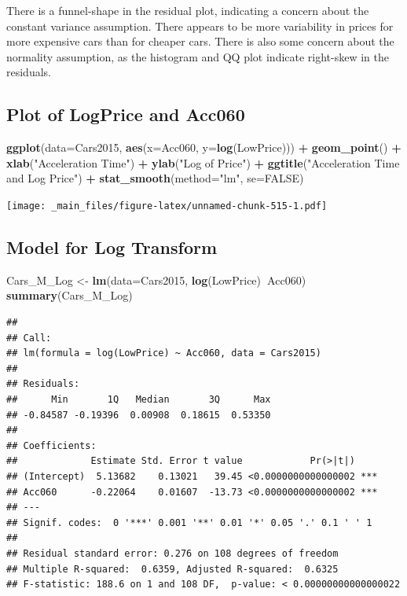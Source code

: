\documentclass[]{book}
\newenvironment{Shaded}{\begin{snugshade}}{\end{snugshade}}
\newcommand{\KeywordTok}[1]{\textcolor[rgb]{0.13,0.29,0.53}{\textbf{#1}}}
\newcommand{\DataTypeTok}[1]{\textcolor[rgb]{0.13,0.29,0.53}{#1}}
\newcommand{\StringTok}[1]{\textcolor[rgb]{0.31,0.60,0.02}{#1}}
\newcommand{\OtherTok}[1]{\textcolor[rgb]{0.56,0.35,0.01}{#1}}
\newcommand{\OperatorTok}[1]{\textcolor[rgb]{0.81,0.36,0.00}{\textbf{#1}}}
\newcommand{\NormalTok}[1]{#1}
\begin{document}
There is a funnel-shape in the residual plot, indicating a concern about
the constant variance assumption. There appears to be more variability
in prices for more expensive cars than for cheaper cars. There is also
some concern about the normality assumption, as the histogram and QQ
plot indicate right-skew in the residuals.

\subsection{Plot of LogPrice and
Acc060}\label{plot-of-logprice-and-acc060}

\begin{Shaded}
\begin{Highlighting}[]
\KeywordTok{ggplot}\NormalTok{(}\DataTypeTok{data=}\NormalTok{Cars2015, }\KeywordTok{aes}\NormalTok{(}\DataTypeTok{x=}\NormalTok{Acc060, }\DataTypeTok{y=}\KeywordTok{log}\NormalTok{(LowPrice))) }\OperatorTok{+}\StringTok{ }\KeywordTok{geom_point}\NormalTok{() }\OperatorTok{+}\StringTok{ }
\StringTok{  }\KeywordTok{xlab}\NormalTok{(}\StringTok{"Acceleration Time"}\NormalTok{) }\OperatorTok{+}\StringTok{ }\KeywordTok{ylab}\NormalTok{(}\StringTok{"Log of Price"}\NormalTok{) }\OperatorTok{+}\StringTok{ }
\StringTok{  }\KeywordTok{ggtitle}\NormalTok{(}\StringTok{"Acceleration Time and Log Price"}\NormalTok{) }\OperatorTok{+}\StringTok{ }\KeywordTok{stat_smooth}\NormalTok{(}\DataTypeTok{method=}\StringTok{"lm"}\NormalTok{, }\DataTypeTok{se=}\OtherTok{FALSE}\NormalTok{)}
\end{Highlighting}
\end{Shaded}

\texttt{[image: \_main\_files/figure-latex/unnamed-chunk-515-1.pdf]}

\subsection{Model for Log Transform}\label{model-for-log-transform}

\begin{Shaded}
\begin{Highlighting}[]
\NormalTok{Cars_M_Log <-}\StringTok{ }\KeywordTok{lm}\NormalTok{(}\DataTypeTok{data=}\NormalTok{Cars2015, }\KeywordTok{log}\NormalTok{(LowPrice)}\OperatorTok{~}\NormalTok{Acc060)}
\KeywordTok{summary}\NormalTok{(Cars_M_Log)}
\end{Highlighting}
\end{Shaded}

\begin{verbatim}
## 
## Call:
## lm(formula = log(LowPrice) ~ Acc060, data = Cars2015)
## 
## Residuals:
##      Min       1Q   Median       3Q      Max 
## -0.84587 -0.19396  0.00908  0.18615  0.53350 
## 
## Coefficients:
##             Estimate Std. Error t value            Pr(>|t|)    
## (Intercept)  5.13682    0.13021   39.45 <0.0000000000000002 ***
## Acc060      -0.22064    0.01607  -13.73 <0.0000000000000002 ***
## ---
## Signif. codes:  0 '***' 0.001 '**' 0.01 '*' 0.05 '.' 0.1 ' ' 1
## 
## Residual standard error: 0.276 on 108 degrees of freedom
## Multiple R-squared:  0.6359, Adjusted R-squared:  0.6325 
## F-statistic: 188.6 on 1 and 108 DF,  p-value: < 0.00000000000000022
\end{verbatim}
\end{document}

